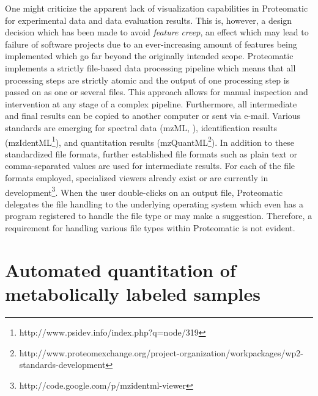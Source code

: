 One might criticize the apparent lack of visualization capabilities in 
Proteomatic for experimental data and data evaluation results.
This is, however, a design decision which has been made to avoid {\em feature 
creep}, an effect which may lead to failure of software projects due to
an ever-increasing amount of features being implemented which go far beyond the 
originally intended scope.
Proteomatic implements a strictly file-based data processing pipeline which
means that all processing steps are strictly atomic and the output of one
processing step is passed on as one or several files.
This approach allows for manual inspection and intervention at any stage of
a complex pipeline.
Furthermore, all intermediate and final results can be copied to another 
computer or sent via e-mail.
Various standards are emerging for spectral data (mzML, \cite{Deutsch2008}), 
identification results (mzIdentML\footnote{http://www.psidev.info/index.php?q=node/319}), and quantitation results 
(mzQuantML\footnote{http://www.proteomexchange.org/project-organization/workpackages/wp2-standards-development}).
In addition to these standardized file formats, further established file 
formats such as plain text or comma-separated values are used for intermediate 
results.
For each of the file formats employed, specialized viewers already exist
or are currently in development\footnote{http://code.google.com/p/mzidentml-viewer}.
When the user double-clicks on an output file, Proteomatic delegates the
file handling to the underlying operating system which even has a program 
registered to handle the file type or may make a suggestion.
Therefore, a requirement for handling various file types within Proteomatic
is not evident.


% 


\section{Automated quantitation of metabolically labeled samples}


